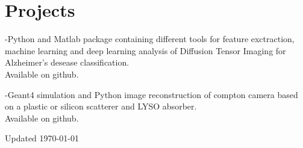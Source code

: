 \documentclass[11pt,letterpaper]{report}
\newcommand{\listitemspace}{0.25em}
\renewenvironment{itemize}
{\begin{list}{}{\setlength{\leftmargin}{0em}
                \setlength{\parskip}{0em}
                \setlength{\itemsep}{\listitemspace}
                \setlength{\parsep}{\listitemspace}}}
{\end{list}}
\begin{document}
    \section*{Projects}
    \begin{itemize}
        \item -Python and Matlab package containing different tools for feature exctraction, machine learning and deep learning analysis of Diffusion Tensor Imaging for Alzheimer's desease classification. 
         \\Available on github.
        \item -Geant4 simulation and Python image reconstruction of compton camera based on a plastic or silicon 
        scatterer and LYSO absorber. \\Available on github.    
    \end{itemize}



%
%
%
%


    \begin{center}
        \vfill
        Updated \monthyeardate\today
    \end{center}
\end{document}

